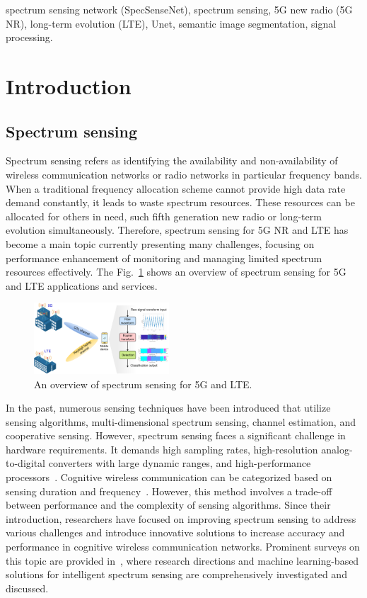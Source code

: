 \documentclass[journal]{IEEEtran} %
\begin{document}
\begin{IEEEkeywords}
    spectrum sensing network (SpecSenseNet), spectrum sensing, 5G new radio (5G NR), long-term evolution (LTE), Unet, semantic image segmentation, signal processing.
\end{IEEEkeywords}

\section{Introduction}
\subsection{Spectrum sensing}
Spectrum sensing refers as identifying the availability and non-availability of wireless communication networks or radio networks in particular frequency bands. When a traditional frequency allocation scheme cannot provide high data rate demand constantly, it leads to waste spectrum resources. These resources can be allocated for others in need, such fifth generation new radio or long-term evolution simultaneously. Therefore, spectrum sensing for 5G NR and LTE has become a main topic currently presenting many challenges, focusing on performance enhancement of monitoring and managing limited spectrum resources effectively. The Fig.~\ref{fig1} shows an overview of spectrum sensing for 5G and LTE applications and services.

\begin{figure}[!ht]
    \centering
    \includegraphics[width=0.45\textwidth]{img/Design-Overview.pdf}
    \caption{An overview of spectrum sensing for 5G and LTE.}
    \label{fig1}
\end{figure}

In the past, numerous sensing techniques have been introduced that utilize sensing algorithms, multi-dimensional spectrum sensing, channel estimation, and cooperative sensing. However, spectrum sensing faces a significant challenge in hardware requirements. It demands high sampling rates, high-resolution analog-to-digital converters with large dynamic ranges, and high-performance processors~\cite{YucekSpectrumSensing}. Cognitive wireless communication can be categorized based on sensing duration and frequency~\cite{kumar2024analysis}. However, this method involves a trade-off between performance and the complexity of sensing algorithms. Since their introduction, researchers have focused on improving spectrum sensing to address various challenges and introduce innovative solutions to increase accuracy and performance in cognitive wireless communication networks. Prominent surveys on this topic are provided in~\cite{ali2016advances, liyanaarachchi2021optimized}, where research directions and machine learning-based solutions for intelligent spectrum sensing are comprehensively investigated and discussed.
\end{document}
